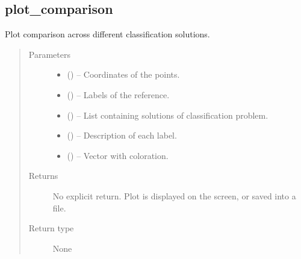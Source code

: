 \documentclass[a4paper,10pt,english]{sphinxmanual}
\begin{document}
\subsection{plot\_comparison}
\label{\detokenize{api/ucf.plot_comparison:plot-comparison}}\label{\detokenize{api/ucf.plot_comparison::doc}}

\begin{fulllineitems}
\label{\detokenize{api/ucf.plot_comparison:ucf.plot_comparison}}
Plot comparison across different classification solutions.
\begin{quote}\begin{description}
\item[{Parameters}] \leavevmode\begin{itemize}
\item {} 
 () -- Coordinates of the points.

\item {} 
 () -- Labels of the reference.

\item {} 
 () -- List containing solutions of classification problem.

\item {} 
 () -- Description of each label.

\item {} 
 () -- Vector with coloration.

\end{itemize}

\item[{Returns}] \leavevmode
No explicit return. Plot is displayed on the screen, or saved
into a file.

\item[{Return type}] \leavevmode
None

\end{description}\end{quote}

\end{fulllineitems}
\end{document}
